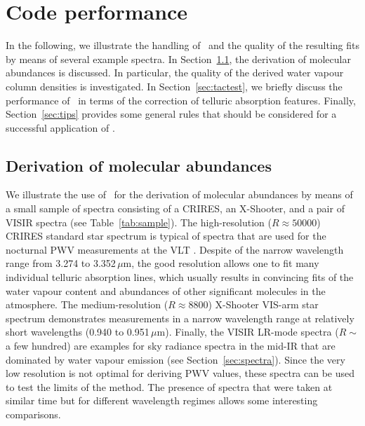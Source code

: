 \section{Code performance}\label{sec:evaluation}
In the following, we illustrate the handling of \mf\ and the quality of the
resulting fits by means of several example spectra. In Section~\ref{sec:pwv},
the derivation of molecular abundances is discussed. In particular, the quality
of the derived water vapour column densities is investigated.
In Section~\ref{sec:tactest}, we briefly discuss the performance of \mf\ in
terms of the correction of telluric absorption features. Finally,
Section~\ref{sec:tips} provides some general rules that should be considered
for a successful application of \mf.

\subsection{Derivation of molecular abundances}\label{sec:pwv}
We illustrate the use of \mf\ for the derivation of molecular abundances by
means of a small sample of spectra consisting of a CRIRES, an X-Shooter, and
a pair of VISIR spectra (see Table~\ref{tab:sample}). The high-resolution
($R \approx 50000$) CRIRES standard star spectrum is typical of spectra that
are used for the nocturnal \ac{PWV} measurements at the VLT \cite{PWV}. Despite
of the narrow wavelength range from 3.274 to 3.352\,$\mu$m, the good resolution
allows one to fit many individual telluric absorption lines, which usually
results in convincing fits of the water vapour content and abundances of other
significant molecules in the atmosphere. The medium-resolution
($R \approx 8800$) X-Shooter VIS-arm star spectrum demonstrates \cite{PWV}
measurements in a narrow wavelength range at relatively short wavelengths
(0.940 to 0.951\,$\mu$m). Finally, the VISIR LR-mode spectra
($R \sim$ a few hundred) are examples for sky radiance spectra in the mid-IR
that are dominated by water vapour emission (see Section~\ref{sec:spectra}).
Since the very low resolution is not optimal for deriving \ac{PWV} values,
these spectra can be used to test the limits of the method. The presence of
spectra that were taken at similar time but for different wavelength regimes
allows some interesting comparisons.

